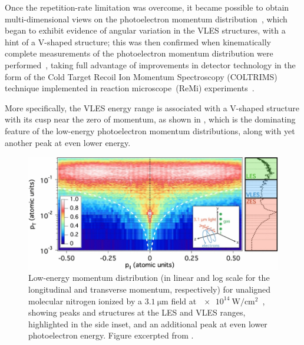Once the repetition-rate limitation was overcome, it became possible to obtain multi-dimensional views on the photoelectron momentum distribution~\cite{ dura_ionization_2013}, which began to exhibit evidence of angular variation in the VLES structures, with a hint of a V-shaped structure; this was then confirmed when kinematically complete measurements of the photoelectron momentum distribution were performed~\cite{pullen_kinematically_2014}, taking full advantage of improvements in detector technology in the form of the Cold Target Recoil Ion Momentum Spectroscopy (COLTRIMS) technique implemented in reaction microscope~(ReMi) experiments~\cite{moshammer_ReMi_2003,reaction_microscope}.



More specifically, the VLES energy range is associated with a V-shaped structure with its cusp near the zero of momentum, as shown in , which is the dominating feature of the low-energy photoelectron momentum distributions, along with yet another peak at even lower energy. 

\begin{figure}[htb]
  \centering
  \includegraphics[scale=1]{6-LES/Figures/figure6D.jpg}
  \caption[
  Observation of (Near-)Zero Energy Structures by Pullen et al.
  ]{
  Low-energy momentum distribution (in linear and log scale for the longitudinal and transverse momentum, respectively) for unaligned molecular nitrogen ionized by a $\SI{3.1}{\micro\meter}$ field at $\SI{e14}{\watt/\centi\meter^2}$~\cite{ pullen_kinematically_2014}, showing peaks and structures at the LES and VLES ranges, highlighted in the side inset, and an additional peak at even lower photoelectron energy.
  Figure excerpted from .
  }
\label{f6-pullen-original-full-spectrum}
\end{figure}






